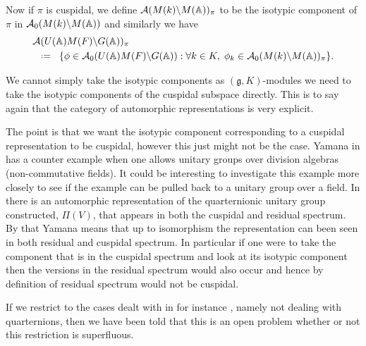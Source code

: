 Now if \(\pi\) is cuspidal, we define \(\mathcal{A}(M(k) \backslash M(\A))_\pi\) to be the isotypic component of \(\pi\) in \(\mathcal{A}_0(M(k) \backslash M(\A))\) and similarly we have 
\begin{align*}
	&\mathcal{A}(U(\A)M(F) \backslash G(\A))_\pi \\
&\defeq \{\phi \in \mathcal{A}_0(U(\A)M(F) \backslash G(\A)) : \forall k\in K, \; \phi_k\in\mathcal{A}_0(M(k) \backslash M(\A))_{\pi} \}.
\end{align*}

\begin{remark}
    We cannot simply take the isotypic components as \((\mathfrak{g}, K)\)-modules we need to take the isotypic components of the cuspidal subspace directly. This is to say again that the category of automorphic representations is very explicit. 
\end{remark}

The point is that we want the isotypic component corresponding to a cuspidal representation to be cuspidal, however this just might not be the case. 
Yamana in \cite[Remark. 7.12]{yamanaSiegelWeilFormulaQuaternionic2013} has a counter example when one allows unitary groups over division algebras (non-commutative fields). It could be interesting to investigate this example more closely to see if the example can be pulled back to a unitary group over a field. In \cite{yamanaSiegelWeilFormulaQuaternionic2013} there is an automorphic representation of the quarternionic unitary group constructed, \(\Pi(V)\), that appears in both the cuspidal and residual spectrum. By that Yamana means that up to isomorphism the representation can been seen in both residual and cuspidal spectrum. In particular if one were to take the component that is in the cuspidal spectrum and look at its isotypic component then the versions in the residual spectrum would also occur and hence by definition of residual spectrum would not be cuspidal.

If we restrict to the cases dealt with in for instance \cite{moeglinSpectralDecompositionEisenstein1995}, namely not dealing with quarternions, then we have been told that this is an open problem whether or not this restriction is superfluous. 




